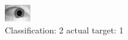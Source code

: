 \begin{figure}[h!]
\begin{center}
\includegraphics[width=0.60\columnwidth]{figures/ID1558_class_2_target_1.png}
\end{center}
\caption{ Classification: 2 actual target: 1}
\label{fig:ID1558_class_2_target_1}
\end{figure}

